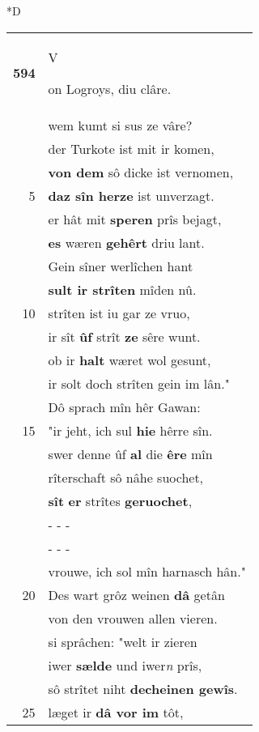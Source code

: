 \documentclass[8pt,a4paper,notitlepage]{article}
\begin{document}
\begin{table}[ht]
\begin{minipage}[t]{0.5\linewidth}
\small
\begin{center}*D
\end{center}
\begin{tabular}{rl}
\textbf{594} & \begin{large}V\end{large}on Logroys, diu clâre.\\ 
 & wem kumt si sus ze vâre?\\ 
 & der Turkote ist mit ir komen,\\ 
 & \textbf{von dem} sô dicke ist vernomen,\\ 
5 & \textbf{daz sîn herze} ist unverzagt.\\ 
 & er hât mit \textbf{speren} prîs bejagt,\\ 
 & \textbf{es} wæren \textbf{gehêrt} driu lant.\\ 
 & Gein sîner werlîchen hant\\ 
 & \textbf{sult ir strîten} mîden nû.\\ 
10 & strîten ist iu gar ze vruo,\\ 
 & ir sît \textbf{ûf} strît \textbf{ze} sêre wunt.\\ 
 & ob ir \textbf{halt} wæret wol gesunt,\\ 
 & ir solt doch strîten gein im lân."\\ 
 & Dô sprach mîn hêr Gawan:\\ 
15 & "ir jeht, ich sul \textbf{hie} hêrre sîn.\\ 
 & swer denne ûf \textbf{al} die \textbf{êre} mîn\\ 
 & rîterschaft sô nâhe suochet,\\ 
 & \textbf{sît} \textbf{er} strîtes \textbf{geruochet},\\ 
 & \multicolumn{1}{l}{ - - - }\\ 
 & \multicolumn{1}{l}{ - - - }\\ 
 & vrouwe, ich sol mîn harnasch hân."\\ 
20 & Des wart grôz weinen \textbf{dâ} getân\\ 
 & von den vrouwen allen vieren.\\ 
 & si sprâchen: "welt ir zieren\\ 
 & iwer \textbf{sælde} und iwer\textit{n} prîs,\\ 
 & sô strîtet niht \textbf{decheinen gewîs}.\\ 
25 & læget ir \textbf{dâ vor im} tôt,\\ 

\end{tabular}
\end{minipage}
\end{table}
\end{document}
